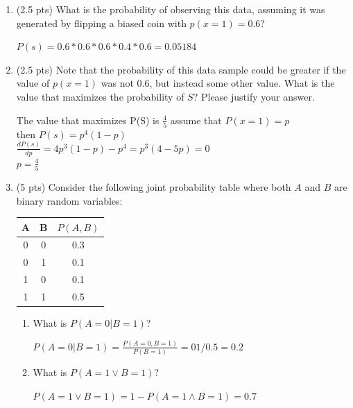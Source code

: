 \documentclass[a4paper]{article}
\theoremstyle{definition}
\newenvironment{soln}{
	\leavevmode\color{blue}\ignorespaces
}{}
\begin{document}
	\begin{enumerate}
		\item 	(2.5 pts) What is the probability of observing this data, assuming it was generated by flipping a biased coin with $p(x=1) = 0.6$?
		
		\begin{soln}
			$P(s) = 0.6 * 0.6 * 0.6 * 0.4 * 0.6 = 0.05184$
		\end{soln}
		
		\item 	(2.5 pts) Note that the probability of this data sample could be greater if the value of $p(x = 1)$ was not $0.6$, but instead some other value. What is the value that maximizes the probability of $S$? Please justify your answer.\\
		\begin{soln}
			The value that maximizes P(S) is $\frac{4}{5}$
			assume that $P(x=1) = p$ \\
			then $P(s) = p^{4}(1-p)$ \\
			$\frac{d P(s)}{d p} = 4p^{3}(1-p) - p^{4} = p^{3}(4-5p) = 0$\\
			$p = \frac{4}{5}$
		\end{soln}
		
		\item 	(5 pts) Consider the following joint probability table where both $A$ and $B$ are binary random variables: 
		\begin{table}[htb]
			\centering
			\begin{tabular}{ccc}\hline
				A & B & $P(A, B)$  \\\hline
				0 & 0 & 0.3 \\
				0 & 1 & 0.1 \\
				1 & 0 & 0.1 \\
				1 & 1 & 0.5 \\\hline
			\end{tabular}
		\end{table}
		\begin{enumerate}
			\item 	What is $P(A = 0 | B = 1)$?\\
			\begin{soln}  
				$P(A = 0 | B = 1) = \frac{P(A = 0, B = 1)}{P(B = 1)} = 01 / 0.5 = 0.2$ 
			\end{soln}
			 
			\item 	What is $P(A = 1 \vee B = 1 )$?\\
		     \begin{soln}  
				$P(A = 1 \vee B = 1 ) = 1 - P(A = 1\wedge B = 1) = 0.7$ 
			\end{soln}
		\end{enumerate}
	\end{enumerate}
	
\end{document}
